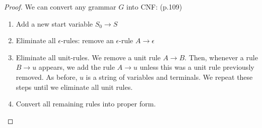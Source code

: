 \documentclass[11pt]{article}
\theoremstyle{definition}
\begin{document}
\begin{proof}
We can convert any grammar $G$ into CNF: (p.109)
\begin{enumerate}
    \item Add a new start variable $S_0\to S$
    \item Eliminate all $\epsilon$-rules: remove an $\epsilon$-rule $A\to \epsilon$
    \item Eliminate all unit-rules. We remove a unit rule $A \to B$. Then, whenever a rule $B \to u$ appears, we add the rule $A \to u$ unless this was a unit rule previously removed. As before, $u$ is a string of variables and terminals. We repeat these steps until we eliminate all unit rules.
    \item Convert all remaining rules into proper form.
\end{enumerate}
\end{proof}
\end{document}
